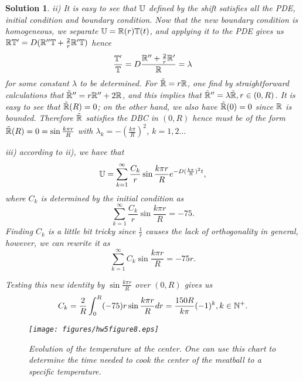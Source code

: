 \documentclass[6pt]{article}
\newtheorem{solution}{Solution}
\numberwithin{equation}{section}
\def\mathbb{\Bbb}
\begin{document}
\begin{enumerate}
\begin{solution}
ii)  It is easy to see that $\mathbb U$ defined by the shift satisfies all the PDE, initial condition and boundary condition.  Now that the new boundary condition is homogeneous, we separate $\mathbb U=\mathbb R(r)\mathbb T(t)$, and applying it to the PDE gives us $\mathbb R\mathbb T'=D(\mathbb R''\mathbb T+\frac{2}{r}\mathbb R'\mathbb T)$ hence
\[\frac{\mathbb T'}{\mathbb T}=D\frac{\mathbb R''+\frac{2}{r}\mathbb R'}{\mathbb R}=\lambda\]
for some constant $\lambda$ to be determined.  For $\tilde {\mathbb R}=r \mathbb R$, one find by straightforward calculations that $\tilde {\mathbb R}''=r\mathbb R''+2\mathbb R$, and this implies that $\tilde {\mathbb R}''=\lambda \tilde {\mathbb R}, r\in(0,R)$.  It is easy to see that $\tilde {\mathbb R}(R)=0$; on the other hand, we also have $\tilde {\mathbb R}(0)=0$ since $\mathbb R$ is bounded.  Therefore $\tilde {\mathbb R}$ satisfies the DBC in $(0,R)$ hence must be of the form $\tilde {\mathbb R}(R)=0=\sin \frac{k\pi r}{R}$ with $\lambda_k=-(\frac{k\pi}{R})^2$, $k=1,2...$


iii) according to ii), we have that
\[\mathbb U=\sum_{k=1}^\infty \frac{C_k}{r}\sin\frac{k\pi r}{R}e^{-D(\frac{k\pi}{R})^2t},\]
where $C_k$ is determined by the initial condition as
\[\sum_{k=1}^\infty \frac{C_k}{r}\sin\frac{k\pi r}{R} =-75.\]
Finding $C_k$ is a little bit tricky since $\frac{1}{r}$ causes the lack of orthogonality in general, however, we can rewrite it as
\[\sum_{k=1}^\infty C_k\sin\frac{k\pi r}{R} =-75r.\]

Testing this new identity by $\sin \frac{k\pi r}{R}$ over $(0,R)$ gives us
\[C_k=\frac{2}{R}\int_0^R(-75)r\sin \frac{k\pi r}{R}dr=\frac{150R}{k\pi}(-1)^k,k\in\mathbb N^+.\]

\begin{figure}[h]\vspace{-8mm}
  \centering
\texttt{[image: figures/hw5figure8.eps]}
\caption{Evolution of the temperature at the center.  One can use this chart to determine the time needed to cook the center of the meatball to a specific temperature.}
\end{figure}

\end{solution}





\end{enumerate}
\end{document}

